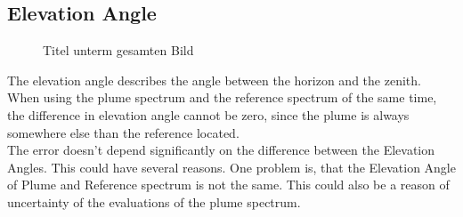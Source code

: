 \documentclass  [
  paper    = a4,
  BCOR     = 10mm,
  twoside,
  fontsize = 12pt,
  fleqn,
  toc      = bibnumbered,
  toc      = listofnumbered,
  numbers  = noendperiod,
  headings = normal,
  listof   = leveldown,
  version  = 3.03
]                                       {scrreprt}
\begin{document}
	\subsection{Elevation Angle}
		\begin{figure}[h!]			
		\caption{Titel unterm gesamten Bild}
	\end{figure}
	The elevation angle describes the angle between the horizon and the zenith. When using the plume spectrum and the reference spectrum of the same time, the difference in elevation angle cannot be zero, since the plume is always somewhere else than the reference located.\\
	The  error doesn't depend significantly on the difference between the Elevation Angles. This could have several reasons. One problem is, that the Elevation Angle of Plume and Reference spectrum is not the same. This could also be a reason of uncertainty of the evaluations of the plume spectrum.
\end{document}
